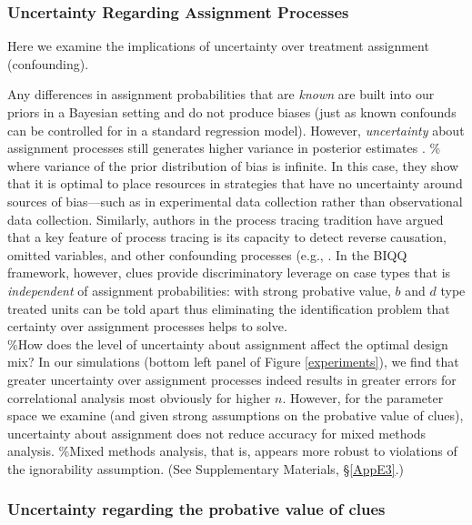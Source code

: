 \documentclass[12pt,]{book}
\begin{document}
\subsubsection{Uncertainty Regarding Assignment Processes}

Here we examine the implications of uncertainty over treatment assignment (confounding).

Any differences in assignment probabilities that are \emph{known} are built into our priors in a Bayesian setting and do not produce biases (just as known confounds can be controlled for in a standard regression model). However, \emph{uncertainty} about assignment processes still generates higher variance in posterior estimates \citep[see][]{GerGreKap04}. \% where variance of the prior distribution of bias is infinite. In this case, they show that it is optimal to place resources in strategies that have no uncertainty around sources of bias---such as in experimental data collection rather than observational data collection. Similarly, authors in the process tracing tradition have argued that a key feature of process tracing is its capacity to detect reverse causation, omitted variables, and other confounding processes (e.g., \citep{Lieberman2005nested}.
In the BIQQ framework, however, clues provide discriminatory leverage on case types that is \emph{independent} of assignment probabilities: with strong probative value, \(b\) and \(d\) type treated units can be told apart thus eliminating the identification problem that certainty over assignment processes helps to solve.\\
\%How does the level of uncertainty about assignment affect the optimal design mix?
In our simulations (bottom left panel of Figure \ref{experiments}), we find that greater uncertainty over assignment processes indeed results in greater errors for correlational analysis \textbar{} most obviously for higher \(n\). However, for the parameter space we examine (and given strong assumptions on the probative value of clues), uncertainty about assignment does not reduce accuracy for mixed methods analysis. \%Mixed methods analysis, that is, appears more robust to violations of the ignorability assumption.
(See Supplementary Materials, \S\ref{AppE3}.)

\subsubsection{Uncertainty regarding the probative value of clues}
\end{document}
